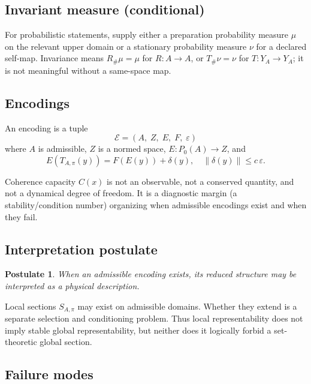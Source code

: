 \documentclass[11pt]{article}
\theoremstyle{plain}
\theoremstyle{plain}
\newtheorem{postulate}{Postulate}[section]
\begin{document}
\subsection{Invariant measure (conditional)}

\begin{assumption}
For probabilistic statements, supply either a preparation probability
measure $\mu$ on the relevant upper domain or a stationary probability
measure $\nu$ for a declared self-map.  Invariance means
$R_\#\mu=\mu$ for $R:A\to A$, or $T_\#\nu=\nu$ for
$T:Y_A\to Y_A$; it is not meaningful without a same-space map.
\end{assumption}

\subsection{Encodings}

\begin{definition}[Encoding]
An encoding is a tuple
\[
\mathcal E=(A,\;Z,\;E,\;F,\;\varepsilon)
\]
where $A$ is admissible, $Z$ is a normed space,
$E:P_0(A)\to Z$, and
\[
E(T_{A,\pi}(y)) = F(E(y)) + \delta(y),
\quad \|\delta(y)\|\le c\,\varepsilon.
\]
\end{definition}
\begin{remark}
Coherence capacity $C(x)$ is not an observable, not a conserved quantity,
and not a dynamical degree of freedom. It is a diagnostic margin (a stability/condition
number) organizing when admissible encodings exist and when they fail.
\end{remark}

\subsection{Interpretation postulate}

\begin{postulate}
When an admissible encoding exists, its reduced structure
may be interpreted as a physical description.
\end{postulate}
\begin{remark}
Local sections $S_{A,\pi}$ may exist on admissible domains.
Whether they extend is a separate selection and conditioning problem.
Thus local representability does not imply stable global representability,
but neither does it logically forbid a set-theoretic global section.
\end{remark}

\subsection{Failure modes}
\end{document}
